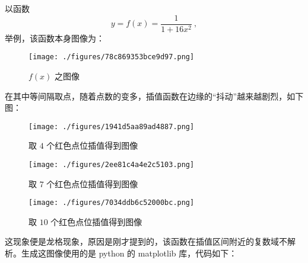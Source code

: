 以函数
$$y = f(x) = \frac1{1+16 x^2} ~,$$
举例，该函数本身图像为：
\begin{figure}[ht]
\centering
\texttt{[image: ./figures/78c869353bce9d97.png]}
\caption{$f(x)$ 之图像} \label{fig_PolyIP_1}
\end{figure}
在其中等间隔取点，随着点数的变多，插值函数在边缘的“抖动”越来越剧烈，如下图：
\begin{figure}[ht]
\centering
\texttt{[image: ./figures/1941d5aa89ad4887.png]}
\caption{取 $4$ 个红色点位插值得到图像} \label{fig_PolyIP_2}
\end{figure}
\begin{figure}[ht]
\centering
\texttt{[image: ./figures/2ee81c4a4e2c5103.png]}
\caption{取 $7$ 个红色点位插值得到图像} \label{fig_PolyIP_3}
\end{figure}
\begin{figure}[ht]
\centering
\texttt{[image: ./figures/7034ddb6c52000bc.png]}
\caption{取 $10$ 个红色点位插值得到图像} \label{fig_PolyIP_4}
\end{figure}
这现象便是龙格现象，原因是刚才提到的，该函数在插值区间附近的复数域不解析。生成这图像使用的是 python 的 matplotlib 库，代码如下：

